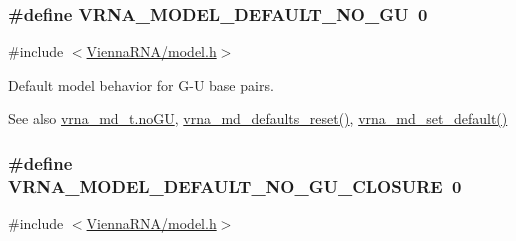 \subsubsection[{\texorpdfstring{V\+R\+N\+A\+\_\+\+M\+O\+D\+E\+L\+\_\+\+D\+E\+F\+A\+U\+L\+T\+\_\+\+N\+O\+\_\+\+GU}{VRNA_MODEL_DEFAULT_NO_GU}}]{\setlength{\rightskip}{0pt plus 5cm}\#define V\+R\+N\+A\+\_\+\+M\+O\+D\+E\+L\+\_\+\+D\+E\+F\+A\+U\+L\+T\+\_\+\+N\+O\+\_\+\+GU~0}\hypertarget{group__model__details_ga34702f7d14d38b877ba8e475281e97e2}{}\label{group__model__details_ga34702f7d14d38b877ba8e475281e97e2}


{\ttfamily \#include $<$\hyperlink{model_8h}{Vienna\+R\+N\+A/model.\+h}$>$}



Default model behavior for G-\/U base pairs. 

\begin{DoxySeeAlso}{See also}
\hyperlink{structvrna__md__s_ad64a5eaf9c4550e7525b36a725fec4b2}{vrna\+\_\+md\+\_\+t.\+no\+GU}, \hyperlink{group__model__details_ga70834424cf804d149937de89f80ceb45}{vrna\+\_\+md\+\_\+defaults\+\_\+reset()}, \hyperlink{group__model__details_ga8ac6ff84936282436f822644bf841f66}{vrna\+\_\+md\+\_\+set\+\_\+default()} 
\end{DoxySeeAlso}
\subsubsection[{\texorpdfstring{V\+R\+N\+A\+\_\+\+M\+O\+D\+E\+L\+\_\+\+D\+E\+F\+A\+U\+L\+T\+\_\+\+N\+O\+\_\+\+G\+U\+\_\+\+C\+L\+O\+S\+U\+RE}{VRNA_MODEL_DEFAULT_NO_GU_CLOSURE}}]{\setlength{\rightskip}{0pt plus 5cm}\#define V\+R\+N\+A\+\_\+\+M\+O\+D\+E\+L\+\_\+\+D\+E\+F\+A\+U\+L\+T\+\_\+\+N\+O\+\_\+\+G\+U\+\_\+\+C\+L\+O\+S\+U\+RE~0}\hypertarget{group__model__details_ga5308de46faaca4b9fd16045864901ee7}{}\label{group__model__details_ga5308de46faaca4b9fd16045864901ee7}


{\ttfamily \#include $<$\hyperlink{model_8h}{Vienna\+R\+N\+A/model.\+h}$>$}



